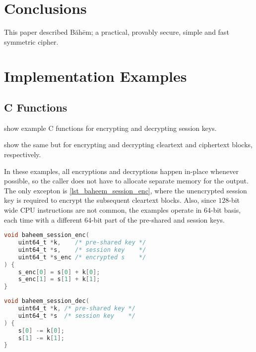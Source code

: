 \documentclass[twocolumn,hidelinks]{article}
\newcommand{\baheem}{Băhēm}
\begin{document}
\section{Conclusions}
This paper described \baheem; a practical, provably secure, simple and fast
symmetric cipher.




\vfill
\break

\appendix
\section{Implementation Examples}
\subsection{C Functions}
 show example C
functions for encrypting and decrypting session keys.

 show the same but for
encrypting and decrypting cleartext and ciphertext blocks, respectively.

In these examples, all encryptions and decryptions happen in-place whenever
possible, so the caller does not have to allocate separate memory for the
output.  The only excepton is \cref{lst_baheem_session_enc}, where the
unencrypted session key is required to encrypt the subsequent cleartext
blocks. Also, since $128$-bit wide CPU instructions are not common, the
examples operate in $64$-bit basis, each time with a different $64$-bit
part of the pre-shared and session keys.

\begin{lstlisting}[language=C, caption=Session key encryption function
                   example., label=lst_baheem_session_enc]
void baheem_session_enc(
    uint64_t *k,    /* pre-shared key */
    uint64_t *s,    /* session key    */
    uint64_t *s_enc /* encrypted s    */
) {
    s_enc[0] = s[0] + k[0];
    s_enc[1] = s[1] + k[1];
}
\end{lstlisting}

\begin{lstlisting}[language=C, caption=Session key decryption function
                   example., label=lst_baheem_session_dec]
void baheem_session_dec(
    uint64_t *k, /* pre-shared key */
    uint64_t *s  /* session key    */
) {
    s[0] -= k[0];
    s[1] -= k[1];
}
\end{lstlisting}
\end{document}
